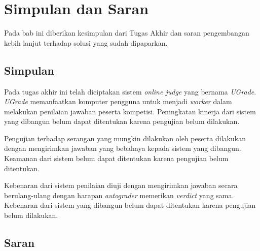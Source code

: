 \chapter{Simpulan dan Saran}


\par Pada bab ini diberikan kesimpulan dari Tugas Akhir dan saran pengembangan kebih lanjut terhadap solusi yang sudah dipaparkan.

\section{Simpulan}


\par Pada tugas akhir ini telah diciptakan sistem \textit{online judge} yang bernama \textit{UGrade}. \textit{UGrade} memanfaatkan komputer pengguna untuk menjadi \textit{worker} dalam melakukan penilaian jawaban peserta kompetisi. Peningkatan kinerja dari sistem yang dibangun belum dapat ditentukan karena pengujian belum dilakukan.

\par Pengujian terhadap serangan yang mungkin dilakukan oleh peserta dilakukan dengan mengirimkan jawaban yang bebahaya kepada sistem yang dibangun. Keamanan dari sistem belum dapat ditentukan karena pengujian belum ditentukan.

\par Kebenaran dari sistem penilaian diuji dengan mengirimkan jawaban secara berulang-ulang dengan harapan \textit{autograder} memerikan \textit{verdict} yang sama. Kebenaran dari sistem yang dibangun belum dapat ditentukan karena pengujian belum dilakukan.

\section{Saran}

